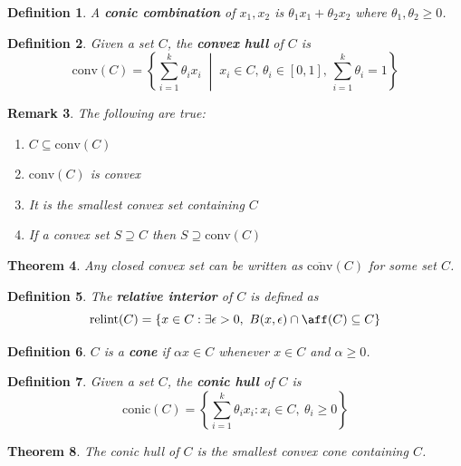 \documentclass[a4paper]{article}
\newtheorem{thm}{Theorem}[section]
\newtheorem{defn}[thm]{Definition}
\newtheorem{rmk}[thm]{Remark}
\begin{document}
\begin{defn}
    A \textbf{conic combination} of $x_1, x_2$ is $\theta_1 x_1 + \theta_2 x_2$ where $\theta_1, \theta_2 \geq 0$.
\end{defn}

\begin{defn}
    Given a set $C$, the \textbf{convex hull} of $C$ is
    \[
        \mathrm{conv}(C) = \left\{ \sum_{i=1}^k \theta_i x_i \;\middle|\; x_i \in C,\, \theta_i \in [0,1],\, \sum_{i=1}^k \theta_i = 1 \right\}
    \]
\end{defn}

\begin{rmk}
    The following are true:
    \begin{enumerate}
        \item $C \subseteq \mathrm{conv}(C)$
        \item $\mathrm{conv}(C)$ is convex
        \item It is the smallest convex set containing $C$
        \item If a convex set $S \supseteq C$ then $S \supseteq \mathrm{conv}(C)$
    \end{enumerate}
\end{rmk}

\begin{thm}
    Any closed convex set can be written as $\overline{\mathrm{conv}}(C)$ for some set $C$.
\end{thm}

\begin{defn}
    The \textbf{relative interior} of $C$ is defined as
    \[
        \mathrm{relint}(C) = \left\{ x \in C : \exists \epsilon > 0,\ B(x, \epsilon) \cap \aff(C) \subseteq C \right\}
    \]
\end{defn}

\begin{defn}
    $C$ is a \textbf{cone} if $\alpha x \in C$ whenever $x \in C$ and $\alpha \geq 0$.
\end{defn}

\begin{defn}
    Given a set $C$, the \textbf{conic hull} of $C$ is
    \[
        \mathrm{conic}(C) = \left\{ \sum_{i=1}^k \theta_i x_i : x_i \in C,\ \theta_i \geq 0 \right\}
    \]
\end{defn}

\begin{thm}
    The conic hull of $C$ is the smallest convex cone containing $C$.
\end{thm}
\end{document}
